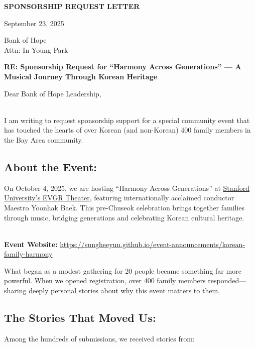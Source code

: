 \documentclass[11pt,letterpaper]{article}
\begin{document}
\noindent
\textbf{\Large SPONSORSHIP REQUEST LETTER}

\vspace{0.3cm}
\noindent
September 23, 2025

\vspace{0.3cm}
\noindent
Bank of Hope\\
Attn: In Young Park

\vspace{0.3cm}
\noindent
\textbf{RE: Sponsorship Request for ``Harmony Across Generations'' --- A Musical Journey Through Korean Heritage}

\vspace{0.3cm}
\noindent
Dear Bank of Hope Leadership,

\ \\
I am writing to request sponsorship support for a special community event that has touched the hearts of over Korean (and non-Korean) 400 family members in the Bay Area community.

\subsection*{About the Event:}

On October 4, 2025, we are hosting ``Harmony Across Generations'' at \href{https://maps.app.goo.gl/W3qRPoNthuNzsjG5A}{Stanford University's EVGR Theater}, featuring internationally acclaimed conductor Maestro Yoonhak Baek. This pre-Chuseok celebration brings together families through music, bridging generations and celebrating Korean cultural heritage.

\ \\
\textbf{Event Website:} \url{https://sungheeyun.github.io/event-announcements/korean-family-harmony}

\vspace{0.2cm}
\noindent
What began as a modest gathering for 20 people became something far more powerful. When we opened registration, over 400 family members responded---sharing deeply personal stories about why this event matters to them.

\subsection*{The Stories That Moved Us:}

Among the hundreds of submissions, we received stories from:
\end{document}
